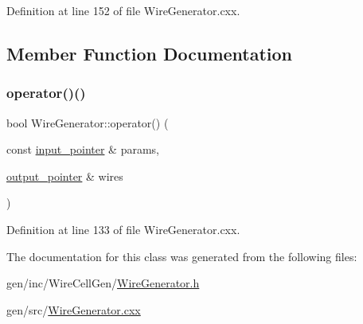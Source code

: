 Definition at line 152 of file Wire\+Generator.\+cxx.



\subsection{Member Function Documentation}
\mbox{\label{class_wire_cell_1_1_wire_generator_a2a71acbc33a0b0f6ec1bd6944359a86f}} 
\subsubsection{\texorpdfstring{operator()()}{operator()()}}
{\footnotesize\ttfamily bool Wire\+Generator\+::operator() (\begin{DoxyParamCaption}\item[{const \hyperlink{class_wire_cell_1_1_i_function_node_a55c0946156df9b712b8ad1a0b59b2db6}{input\+\_\+pointer} \&}]{params,  }\item[{\hyperlink{class_wire_cell_1_1_i_function_node_afc02f1ec60d31aacddf64963f9ca650b}{output\+\_\+pointer} \&}]{wires }\end{DoxyParamCaption})\hspace{0.3cm}{\ttfamily [virtual]}}



Definition at line 133 of file Wire\+Generator.\+cxx.



The documentation for this class was generated from the following files\+:\begin{DoxyCompactItemize}
\item 
gen/inc/\+Wire\+Cell\+Gen/\hyperlink{_wire_generator_8h}{Wire\+Generator.\+h}\item 
gen/src/\hyperlink{_wire_generator_8cxx}{Wire\+Generator.\+cxx}\end{DoxyCompactItemize}
